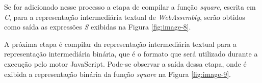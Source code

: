 

Se for adicionado nesse processo a etapa de compilar a função \textit{square}, escrita em
\textit{C}, para a representação intermediária textual de \textit{WebAssembly}, serão
obtidos como saída as expressões \textit{S} exibidas na Figura \ref{fig:image-8}.

\begin{figure}[h!]
    \centering
\end{figure}

A próxima etapa é compilar da representação intermediária textual para a representação
intermediária binária, que é o formato que será utilizado durante a execução pelo motor
JavaScript. Pode-se observar a saída dessa etapa, onde é exibida a representação binária
da função \textit{square} na Figura \ref{fig:image-9}.

\begin{figure}[h!]
    \centering
\end{figure}

